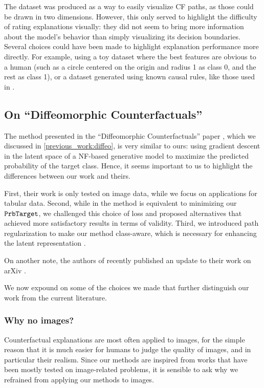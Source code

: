 \documentclass[../main.tex]{subfiles}
\begin{document}
The \CakeOnSea{} dataset was produced as a way to easily visualize CF paths, as those could be drawn in two dimensions.
However, this only served to highlight the difficulty of rating explanations visually: they did not seem to bring more information about the model's behavior than simply visualizing its decision boundaries.
Several choices could have been made to highlight explanation performance more directly.
For example, using a toy dataset where the best features are obvious to a human (such as a circle centered on the origin and radius 1 as class 0, and the rest as class 1), or a dataset generated using known causal rules, like those used in \cite{karimiAlgorithmic2020}.

\subsection{On ``Diffeomorphic Counterfactuals''}

The method presented in the ``Diffeomorphic Counterfactuals'' paper \cite{dombrowskiDiffeomorphic2021}, which we discussed in \autoref{previous_work:diffeo},
is very similar to ours: using gradient descent in the latent space of a NF-based generative model to maximize the predicted probability of the target class.
Hence, it seems important to us to highlight the differences between our work and theirs.

First, their work is only tested on image data, while we focus on applications for tabular data.
Second, while in \cite{dombrowskiDiffeomorphic2021} the method is equivalent to minimizing our $\mathtt{PrbTarget}{}$, we challenged this choice of loss and proposed alternatives that achieved more satisfactory results in terms of validity.
Third, we introduced path regularization to make our method class-aware, which is necessary for enhancing the latent representation \cite{locatelloChallenging2019}.

On another note, the authors of \cite{dombrowskiDiffeomorphic2021} recently published an update to their work on arXiv \cite{dombrowskiDiffeomorphic2022}.

We now expound on some of the choices we made that further distinguish our work from the current literature.

\subsubsection{Why no images?}

Counterfactual explanations are most often applied to images, for the simple reason that it is much easier for humans to judge the quality of images, and in particular their realism.
Since our methods are inspired from works that have been mostly tested on image-related problems, it is sensible to ask why we refrained from applying our methods to images.
\end{document}
